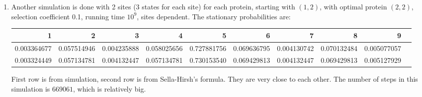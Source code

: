 \documentclass[13pt]{article}
\begin{document}
\begin{enumerate}
\item Another simulation is done with 2 sites (3 states for each site) for each protein, starting with $(1,2)$, with optimal protein $(2,2)$, selection coefficient  0.1, running time $10^9$, sites dependent. The stationary probabilities are:
\begin{table}[here]
\begin{center}
\begin{tabular}{rrrrrrrrrr}
  \hline
  1 & 2 & 3 & 4 & 5 & 6 & 7 & 8 & 9 \\ 
  \hline
 0.003364677 & 0.057514946 & 0.004235888 & 0.058025656 & 0.727881756 & 0.069636795 & 0.004130742 & 0.070132484 & 0.005077057 \\ 
0.003324449 & 0.057134781 & 0.004132447 & 0.057134781 & 0.730153540 & 0.069429813 & 0.004132447 & 0.069429813 & 0.005127929 \\ 
   \hline
\end{tabular}
\end{center}
\end{table}

First row is from simulation, second row is from Sella-Hirsh's formula. They are very close to each other. The number of steps in this simulation is $669061$, which is relatively big.\\


\end{enumerate}
\end{document}
